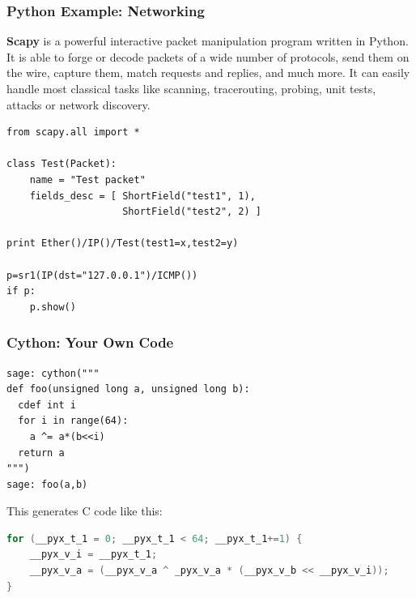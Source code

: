 \documentclass[10pt]{beamer}
\renewcommand{\emph}[1]{\textbf{\color{oxygenblue}#1}}
\begin{document}
\begin{frame}[fragile]
\frametitle{Python Example: Networking}
\begin{small}
\emph{Scapy} is a powerful interactive packet manipulation program written in Python. It is able to forge or decode packets of a wide number of protocols, send them on the wire, capture them, match requests and replies, and much more. It can easily handle most classical tasks like scanning, tracerouting, probing, unit tests, attacks or network discovery.
\end{small}

\begin{lstlisting}
from scapy.all import *

class Test(Packet):
    name = "Test packet"
    fields_desc = [ ShortField("test1", 1),
                    ShortField("test2", 2) ]

print Ether()/IP()/Test(test1=x,test2=y)

p=sr1(IP(dst="127.0.0.1")/ICMP())
if p:
    p.show()
\end{lstlisting}
\end{frame}

\begin{frame}[fragile]
\frametitle{Cython: Your Own Code}
\begin{lstlisting}
sage: cython("""
def foo(unsigned long a, unsigned long b):
  cdef int i
  for i in range(64):
    a ^= a*(b<<i)
  return a
""")
sage: foo(a,b)
\end{lstlisting}

\vspace{1em}

This generates C code like this:

\begin{lstlisting}[language=c]
for (__pyx_t_1 = 0; __pyx_t_1 < 64; __pyx_t_1+=1) {
    __pyx_v_i = __pyx_t_1;
    __pyx_v_a = (__pyx_v_a ^ _pyx_v_a * (__pyx_v_b << __pyx_v_i));
}
\end{lstlisting}
\end{frame}
\end{document}
